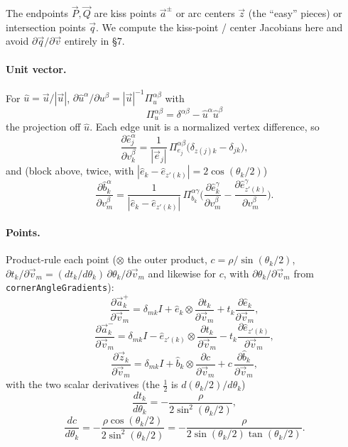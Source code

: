 \documentclass[11pt]{article}
\numberwithin{equation}{section}
\newcommand{\vv}[1]{\vec{#1}}
\begin{document}
The endpoints $\vv P,\vv Q$ are kiss points $\vv a^{\pm}$ or arc centers $\vv z$ (the ``easy''
pieces) or intersection points $\vv q$. We compute the kiss-point / center Jacobians here and avoid
$\partial\vv q/\partial\vv v$ entirely in \S7.

\paragraph{Unit vector.} For $\hat u=\vv u/|\vv u|$, $\partial\hat
u^{\alpha}/\partial u^{\beta}=|\vv u|^{-1}\Pi_u^{\alpha\beta}$ with
\begin{equation}
  \Pi_u^{\alpha\beta}=\delta^{\alpha\beta}-\hat u^{\alpha}\hat u^{\beta}
\end{equation}
the projection off $\hat u$. Each edge unit is a normalized vertex difference, so
\begin{equation}
  \frac{\partial\hat e_j^{\alpha}}{\partial v_k^{\beta}}
  =\frac{1}{|\vv e_j|}\,\Pi_{e_j}^{\alpha\beta}\big(\delta_{z(j)k}-\delta_{jk}\big),
\end{equation}
and (block above, twice, with $|\hat e_k-\hat e_{z'(k)}|=2\cos(\theta_k/2)$)
\begin{equation}
  \frac{\partial\hat b_k^{\alpha}}{\partial v_m^{\beta}}
  =\frac{1}{|\hat e_k-\hat e_{z'(k)}|}\,\Pi_{b_k}^{\alpha\gamma}
  \Big(\frac{\partial\hat e_k^{\gamma}}{\partial v_m^{\beta}}-\frac{\partial\hat e_{z'(k)}^{\gamma}}{\partial v_m^{\beta}}\Big).
\end{equation}

\paragraph{Points.} Product-rule each point ($\otimes$ the outer product, $c=\rho/\sin(\theta_k/2)$,
$\partial t_k/\partial\vv v_m=(dt_k/d\theta_k)\,\partial\theta_k/\partial\vv v_m$ and likewise for
$c$, with $\partial\theta_k/\partial\vv v_m$ from \texttt{cornerAngleGradients}):
\begin{equation}
  \frac{\partial\vv a^{+}_k}{\partial\vv v_m}=\delta_{mk}I+\hat e_k\otimes\frac{\partial t_k}{\partial\vv v_m}+t_k\frac{\partial\hat e_k}{\partial\vv v_m},
\end{equation}
\begin{equation}
  \frac{\partial\vv a^{-}_k}{\partial\vv v_m}=\delta_{mk}I-\hat e_{z'(k)}\otimes\frac{\partial t_k}{\partial\vv v_m}-t_k\frac{\partial\hat e_{z'(k)}}{\partial\vv v_m},
\end{equation}
\begin{equation}
  \frac{\partial\vv z_k}{\partial\vv v_m}=\delta_{mk}I+\hat b_k\otimes\frac{\partial c}{\partial\vv v_m}+c\,\frac{\partial\hat b_k}{\partial\vv v_m},
\end{equation}
with the two scalar derivatives (the $\tfrac12$ is $d(\theta_k/2)/d\theta_k$)
\begin{equation}
  \frac{dt_k}{d\theta_k}=-\frac{\rho}{2\sin^2(\theta_k/2)},
\end{equation}
\begin{equation}
  \frac{dc}{d\theta_k}=-\frac{\rho\cos(\theta_k/2)}{2\sin^2(\theta_k/2)}=-\frac{\rho}{2\sin(\theta_k/2)\tan(\theta_k/2)}.
\end{equation}
\end{document}

